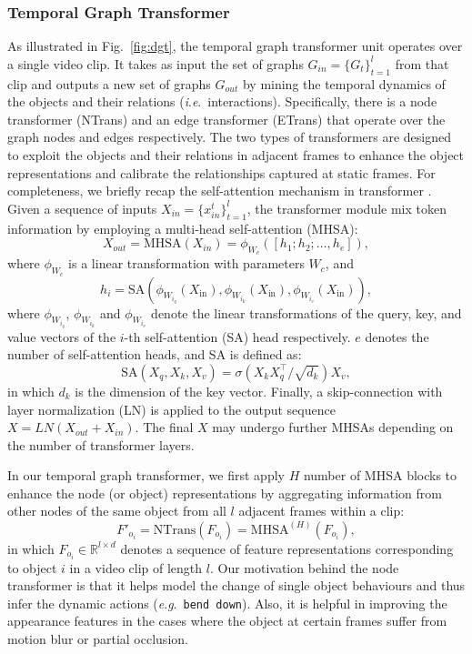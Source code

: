 \documentclass[10pt,journal,compsoc]{IEEEtran}
\newcommand{\ie}{\textit{i}.\textit{e}.}
\newcommand{\eg}{\textit{e}.\textit{g}.}
\begin{document}
\subsubsection{Temporal Graph Transformer}
As illustrated in Fig.~\ref{fig:dgt}, the temporal graph transformer unit operates over a single video clip.  It takes as input the set of graphs $G_{in}=\{G_t\}_{t=1}^l$ from that clip and outputs a new set of graphs $G_{out}$ by mining the temporal dynamics of the objects and their relations (\ie~interactions). Specifically, there is a node transformer (NTrans) and an edge transformer (ETrans) that operate over the graph nodes and edges respectively. The two types of transformers are designed to exploit the objects and their relations in adjacent frames to enhance the object representations and calibrate the relationships captured at static frames.
For completeness, we briefly recap the self-attention mechanism in transformer \cite{vaswani2017attention}. 
Given a sequence of inputs $X_{in}=\{x_{in}^t\}_{t=1}^l$,
the transformer module mix token information by employing a multi-head self-attention (MHSA):
\begin{equation}
X_{out} = \text{MHSA}(X_{in}) = \phi_{W_c}([h_1;h_2;\dots,h_e]),
\end{equation}
where $\phi_{W_c}$ is a linear transformation with parameters $W_c$, and
\begin{equation}
    h_i = \text{SA}(\phi_{W_{i_q}}(X_{\text{in}}), \phi_{W_{i_k}}(X_{\text{in}}), \phi_{W_{i_v}}(X_{\text{in}})),
\end{equation}
where $\phi_{W_{i_q}}$, $\phi_{W_{i_k}}$ and $\phi_{W_{i_v}}$ denote the linear transformations of the query, key, and value vectors of the $i$-th self-attention (SA) head respectively. $e$ denotes the number of self-attention heads, and SA is defined as:
\begin{equation}
     \text{SA}(X_q, X_k, X_v) = \sigma\left({X_k X_q^\mathrm{\intercal}/\sqrt{d_k}}\right)X_v, 
\end{equation}
in which $d_k$ is the dimension of the key vector. Finally, a skip-connection with layer normalization (LN) is applied to the output sequence $X=LN(X_{out}+X_{in})$. The final $X$ may undergo further MHSAs depending on the number of transformer layers.

In our temporal graph transformer, we first apply $H$ number of MHSA blocks to enhance the node (or object) representations by aggregating information from other nodes of the same object from all $l$ adjacent frames within a clip:
\begin{equation}
\label{equ:node}
    F'_{o_i} = \text{NTrans}(F_{o_i})=\text{MHSA}^{(H)}(F_{o_i}),
\end{equation}
in which $F_{o_i} \in \mathbb{R}^{l \times d}$ denotes a sequence of feature representations corresponding to object $i$ in a video clip of length $l$. Our motivation behind the node transformer is that it helps model the change of single object behaviours and thus infer the dynamic actions (\eg~\texttt{bend down}). Also, it is helpful in improving the appearance features in the cases where the object at certain frames suffer from motion blur or partial occlusion.
\end{document}
